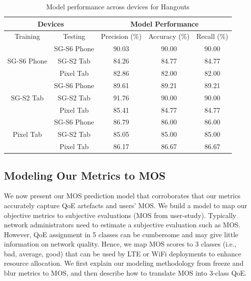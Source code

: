 \begin{table}[t]
\centering
\caption{Model performance across devices for Hangouts}
\label{label:hangouts-devices}
\begin{tabular}{|c|c|c|c|c|}
\hline
\multicolumn{2}{|c|}{Devices}                & \multicolumn{3}{c|}{Model Performance}             \\ \hline
    \multicolumn{1}{|c|}{Training} & Testing     & \multicolumn{1}{c|}{Precision (\%)} & {Accuracy (\%)} & {Recall (\%)} \\ \hline
\multirow{3}{*}{SG-S6 Phone}   & SG-S6 Phone & 90.03  & 90.00 & 90.00       \\ \cline{2-5} 
                               & SG-S2 Tab   & 84.26  & 84.77 & 84.77       \\ \cline{2-5} 
                               & Pixel Tab   & 82.86  & 82.00 & 82.00       \\ \hline
\multirow{3}{*}{SG-S2 Tab}     & SG-S6 Phone & 89.61  & 89.21 & 89.21       \\ \cline{2-5} 
                               & SG-S2 Tab   & 91.76  & 90.00 & 90.00       \\ \cline{2-5} 
                               & Pixel Tab   & 85.41  & 84.77 & 84.77       \\ \hline
\multirow{3}{*}{Pixel Tab}     & SG-S6 Phone & 86.79  & 86.00 & 86.00       \\ \cline{2-5} 
                               & SG-S2 Tab   & 85.05  & 85.00 & 85.00       \\ \cline{2-5} 
                               & Pixel Tab   & 86.17  & 86.67 & 86.67       \\ \hline
\end{tabular}
\end{table}

\subsection{Modeling Our Metrics to MOS} \label{label:model}

We now present our MOS prediction model that corroborates that our metrics accurately capture QoE artefacts and users' MOS. We build a model to map our objective metrics to subjective evaluations (MOS from user-study). Typically network administrators need to estimate a subjective evaluation such as MOS. However, QoE assignment in 5 classes can be cumbersome and may give little information on network quality. Hence, we map MOS scores to 3 classes (i.e., bad, average, good) that can be used by LTE or WiFi deployments to enhance resource allocation. We first explain our modeling methodology from freeze and blur metrics to MOS, and then describe how to translate MOS into 3-class QoE.

